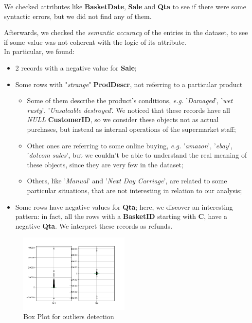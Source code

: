 We checked attributes like \textbf{BasketDate}, \textbf{Sale} and \textbf{Qta} to see if there were some syntactic errors, but we did not find any of them.

Afterwards, we checked the \emph{semantic accuracy} of the entries in the dataset, to see if some value was not coherent with the logic of its attribute.\\
In particular, we found:
\begin{itemize}
\item 2 records with a negative value for \textbf{Sale};

\item Some rows with "\emph{strange}" \textbf{ProdDescr}, not referring to a particular product
	\begin{itemize}
		\item Some of them describe the product's conditions, \emph{e.g.} '\emph{Damaged}', '\emph{wet rusty}', '\emph{Unsaleable destroyed}'. We noticed that these records have all \emph{NULL} \textbf{CustomerID}, so we consider these objects not as actual purchases, but instead as internal operations of the supermarket staff;
		\item Other ones are referring to some online buying, \emph{e.g.} '\emph{amazon}', '\emph{ebay}', '\emph{dotcom sales}', but we couldn't be able to understand the real meaning of these objects, since they are very few in the dataset;
		\item Others, like '\emph{Manual}' and '\emph{Next Day Carriage}', are related to some particular situations, that are not interesting in relation to our analysis;
	\end{itemize}

\item Some rows have negative values for \textbf{Qta}; here, we discover an interesting pattern: in fact, all the rows with a \textbf{BasketID} starting with \textbf{C}, have a negative \textbf{Qta}. We interpret these records as refunds.
\end{itemize}

\begin{figure}
\centering
\includegraphics[width=0.49\textwidth]{img/boxplot_before.png}
\caption{Box Plot for outliers detection}
\end{figure}

